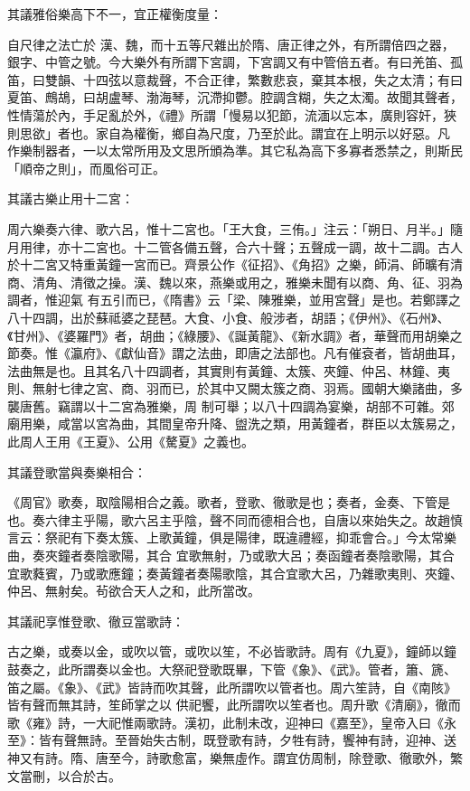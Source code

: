 \begin{pinyinscope}
 其議雅俗樂高下不一，宜正權衡度量：



 自尺律之法亡於
 漢、魏，而十五等尺雜出於隋、唐正律之外，有所謂倍四之器，銀字、中管之號。今大樂外有所謂下宮調，下宮調又有中管倍五者。有曰羌笛、孤笛，曰雙韻、十四弦以意裁聲，不合正律，繁數悲哀，棄其本根，失之太清；有曰夏笛、鷓鴣，曰胡盧琴、渤海琴，沉滯抑鬱。腔調含糊，失之太濁。故聞其聲者，性情蕩於內，手足亂於外，《禮》所謂「慢易以犯節，流湎以忘本，廣則容奸，狹則思欲」者也。家自為權衡，鄉自為尺度，乃至於此。謂宜在上明示以好惡。凡
 作樂制器者，一以太常所用及文思所頒為準。其它私為高下多寡者悉禁之，則斯民「順帝之則」，而風俗可正。



 其議古樂止用十二宮：



 周六樂奏六律、歌六呂，惟十二宮也。「王大食，三侑。」注云：「朔日、月半。」隨月用律，亦十二宮也。十二管各備五聲，合六十聲；五聲成一調，故十二調。古人於十二宮又特重黃鐘一宮而已。齊景公作《征招》、《角招》之樂，師涓、師曠有清商、清角、清徵之操。漢、魏以來，燕樂或用之，雅樂未聞有以商、角、征、羽為調者，惟迎氣
 有五引而已，《隋書》云「梁、陳雅樂，並用宮聲」是也。若鄭譯之八十四調，出於蘇祗婆之琵琶。大食、小食、般涉者，胡語；《伊州》、《石州》、《甘州》、《婆羅門》者，胡曲；《綠腰》、《誕黃龍》、《新水調》者，華聲而用胡樂之節奏。惟《瀛府》、《獻仙音》謂之法曲，即唐之法部也。凡有催袞者，皆胡曲耳，法曲無是也。且其名八十四調者，其實則有黃鐘、太簇、夾鐘、仲呂、林鐘、夷則、無射七律之宮、商、羽而已，於其中又闕太簇之商、羽焉。國朝大樂諸曲，多襲唐舊。竊謂以十二宮為雅樂，周
 制可舉；以八十四調為宴樂，胡部不可雜。郊廟用樂，咸當以宮為曲，其間皇帝升降、盥洗之類，用黃鐘者，群臣以太簇易之，此周人王用《王夏》、公用《驁夏》之義也。



 其議登歌當與奏樂相合：



 《周官》歌奏，取陰陽相合之義。歌者，登歌、徹歌是也；奏者，金奏、下管是也。奏六律主乎陽，歌六呂主乎陰，聲不同而德相合也，自唐以來始失之。故趙慎言云：祭祀有下奏太簇、上歌黃鐘，俱是陽律，既違禮經，抑乖會合。」今太常樂曲，奏夾鐘者奏陰歌陽，其合
 宜歌無射，乃或歌大呂；奏函鐘者奏陰歌陽，其合宜歌蕤賓，乃或歌應鐘；奏黃鐘者奏陽歌陰，其合宜歌大呂，乃雜歌夷則、夾鐘、仲呂、無射矣。茍欲合天人之和，此所當改。



 其議祀享惟登歌、徹豆當歌詩：



 古之樂，或奏以金，或吹以管，或吹以笙，不必皆歌詩。周有《九夏》，鐘師以鐘鼓奏之，此所謂奏以金也。大祭祀登歌既畢，下管《象》、《武》。管者，簫、篪、笛之屬。《象》、《武》皆詩而吹其聲，此所謂吹以管者也。周六笙詩，自《南陔》皆有聲而無其詩，笙師掌之以
 供祀饗，此所謂吹以笙者也。周升歌《清廟》，徹而歌《雍》詩，一大祀惟兩歌詩。漢初，此制未改，迎神曰《嘉至》，皇帝入曰《永至》：皆有聲無詩。至晉始失古制，既登歌有詩，夕牲有詩，饗神有詩，迎神、送神又有詩。隋、唐至今，詩歌愈富，樂無虛作。謂宜仿周制，除登歌、徹歌外，繁文當刪，以合於古。




\end{pinyinscope}
